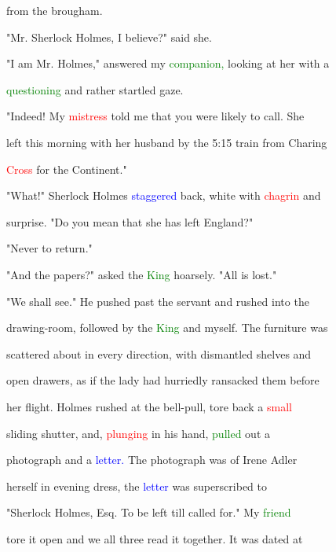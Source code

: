  from the brougham.



 "Mr. Sherlock Holmes, I believe?" said she.



 "I am Mr. Holmes," answered my \textcolor{green}{companion,} looking at her with a

 \textcolor{green}{questioning} and rather \textcolor{BurntOrange}{startled} gaze.



 "Indeed! My \textcolor{red}{mistress} told me that you were likely to call. She

 left this morning with her husband by the 5:15 train from Charing

 \textcolor{red}{Cross} for the Continent."



 "What!" Sherlock Holmes \textcolor{blue}{staggered} back, \textcolor{BurntOrange}{white} with \textcolor{red}{chagrin} and

 \textcolor{BurntOrange}{surprise.} "Do you mean that she has left England?"



 "Never to return."



 "And the papers?" asked the \textcolor{green}{King} hoarsely. "All is \textcolor{BurntOrange}{lost."}



 "We shall see." He pushed past the \textcolor{BurntOrange}{servant} and rushed into the

 drawing-room, followed by the \textcolor{green}{King} and myself. The furniture was

 scattered about in every direction, with dismantled shelves and

 open drawers, as if the lady had hurriedly ransacked them before

 her flight. Holmes rushed at the bell-pull, tore back a \textcolor{red}{small}

 sliding shutter, and, \textcolor{red}{plunging} in his hand, \textcolor{green}{pulled} out a

 photograph and a \textcolor{blue}{letter.} The photograph was of Irene Adler

 herself in evening dress, the \textcolor{blue}{letter} was superscribed to

 "Sherlock Holmes, Esq. To be left till called for." My \textcolor{green}{friend}

 tore it open and we all three read it together. It was dated at

